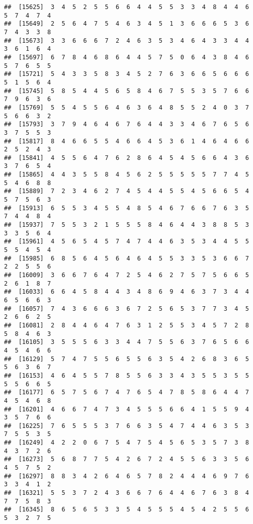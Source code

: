 \documentclass[
]{book}
\begin{document}
\begin{verbatim}
##  [15625]  3  4  5  2  5  5  6  6  4  4  5  5  3  3  4  8  4  4  6  5  7  4  7  4
##  [15649]  2  5  6  4  7  5  4  6  3  4  5  1  3  6  6  6  5  3  6  7  4  3  3  8
##  [15673]  3  3  6  6  6  7  2  4  6  3  5  3  4  6  4  3  3  4  4  3  6  1  6  4
##  [15697]  6  7  8  4  6  8  6  4  4  5  7  5  0  6  4  3  8  4  6  5  7  6  5  5
##  [15721]  5  4  3  3  5  8  3  4  5  2  7  6  3  6  6  5  6  6  6  5  1  5  6  4
##  [15745]  5  8  5  4  4  5  6  5  8  4  6  7  5  5  3  5  7  6  6  7  9  6  3  6
##  [15769]  5  5  4  5  5  6  4  6  3  6  4  8  5  5  2  4  0  3  7  5  6  6  3  2
##  [15793]  3  7  9  4  6  4  6  7  6  4  4  3  3  4  6  7  6  5  6  3  7  5  5  3
##  [15817]  8  4  6  6  5  5  4  6  6  4  5  3  6  1  4  6  4  6  6  2  5  2  4  3
##  [15841]  4  5  5  6  4  7  6  2  8  6  4  5  4  5  6  6  4  3  6  3  7  6  5  4
##  [15865]  4  4  3  5  5  8  4  5  6  2  5  5  5  5  5  7  7  4  5  5  4  6  8  8
##  [15889]  7  2  3  4  6  2  7  4  5  4  4  5  5  4  5  6  6  5  4  5  7  5  6  3
##  [15913]  6  5  5  3  4  5  5  4  8  5  4  6  7  6  6  7  6  3  5  7  4  4  8  4
##  [15937]  7  5  5  3  2  1  5  5  5  8  4  6  4  4  3  8  8  5  3  3  3  5  6  4
##  [15961]  4  5  6  5  4  5  7  4  7  4  4  6  3  5  3  4  4  5  5  5  5  4  5  4
##  [15985]  6  8  5  6  4  5  6  4  6  4  5  5  3  3  5  3  6  6  7  2  2  5  5  6
##  [16009]  3  6  6  7  6  4  7  2  5  4  6  2  7  5  7  5  6  6  5  2  6  1  8  7
##  [16033]  6  6  4  5  8  4  4  3  4  8  6  9  4  6  3  7  3  4  4  6  5  6  6  3
##  [16057]  7  4  3  6  6  6  3  6  7  2  5  6  5  3  7  7  3  4  5  2  6  6  2  5
##  [16081]  2  8  4  4  6  4  7  6  3  1  2  5  5  3  4  5  7  2  8  5  8  4  6  3
##  [16105]  3  5  5  5  6  3  3  4  4  7  5  5  6  3  7  6  5  6  6  4  5  4  6  6
##  [16129]  5  7  4  7  5  5  6  5  5  6  3  5  4  2  6  8  3  6  5  5  6  3  6  7
##  [16153]  4  6  4  5  5  7  8  5  5  6  3  3  4  3  5  5  3  5  5  5  5  6  6  5
##  [16177]  6  5  7  5  6  7  4  7  6  5  4  7  8  5  8  6  4  4  7  4  5  4  6  8
##  [16201]  4  6  6  7  4  7  3  4  5  5  5  6  6  4  1  5  5  9  4  3  5  7  6  6
##  [16225]  7  6  5  5  5  3  7  6  6  3  5  4  7  4  4  6  3  5  3  7  5  5  3  5
##  [16249]  4  2  2  0  6  7  5  4  7  5  4  5  6  5  3  5  7  3  8  4  3  7  2  6
##  [16273]  5  6  8  7  7  5  4  2  6  7  2  4  5  5  6  3  3  5  6  4  5  7  5  2
##  [16297]  8  8  3  4  2  6  4  6  5  7  8  2  4  4  4  6  9  7  6  3  3  4  1  2
##  [16321]  5  5  3  7  2  4  3  6  6  7  6  4  4  6  7  6  3  8  4  7  7  5  8  3
##  [16345]  8  6  5  6  5  3  3  5  4  5  5  5  4  5  4  2  5  5  6  5  3  2  7  5

\end{verbatim}
\end{document}
